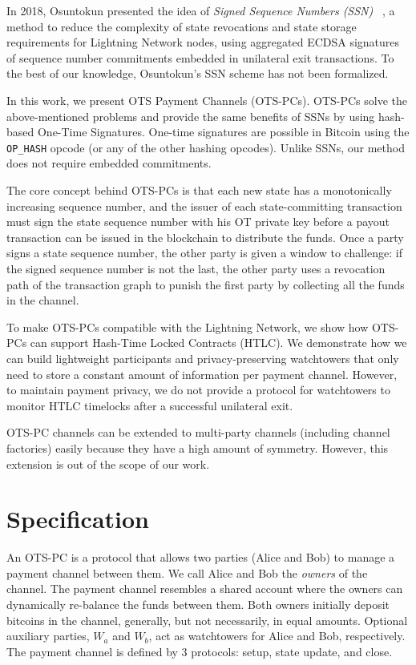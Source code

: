 \documentclass[11pt,a4paper]{article}
\newcommand{\txname}[1]{\texttt{#1}}
\begin{document}
In 2018, Osuntokun presented the idea of \textit{Signed Sequence Numbers (SSN)} ~\cite{osuntokun2018hardeninglightning}, a method to reduce the complexity of state revocations and state storage requirements for Lightning Network nodes, using aggregated ECDSA signatures of sequence number commitments embedded in unilateral exit transactions. To the best of our knowledge, Osuntokun's SSN scheme has not been formalized. 

In this work, we present OTS Payment Channels (OTS-PCs). OTS-PCs solve the above-mentioned problems and provide the same benefits of SSNs by using hash-based One-Time Signatures. One-time signatures are possible in Bitcoin using the \txname{OP\_HASH} opcode (or any of the other hashing opcodes). Unlike SSNs, our method does not require embedded commitments.  

The core concept behind OTS-PCs is that each new state has a monotonically increasing sequence number, and the issuer of each state-committing transaction must sign the state sequence number with his OT private key before a payout transaction can be issued in the blockchain to distribute the funds. Once a party signs a state sequence number, the other party is given a window to challenge: if the signed sequence number is not the last, the other party uses a revocation path of the transaction graph to punish the first party by collecting all the funds in the channel.

To make OTS-PCs compatible with the Lightning Network, we show how OTS-PCs can support Hash-Time Locked Contracts (HTLC). We demonstrate how we can build lightweight participants and privacy-preserving watchtowers that only need to store a constant amount of information per payment channel. However, to maintain payment privacy, we do not provide a protocol for watchtowers to monitor HTLC timelocks after a successful unilateral exit.

OTS-PC channels can be extended to multi-party channels (including channel factories) easily because they have a high amount of symmetry. However, this extension is out of the scope of our work.

\section{Specification}

An OTS-PC is a protocol that allows two parties (Alice and Bob) to manage a payment channel between them. We call Alice and Bob the \textit{owners} of the channel. The payment channel resembles a shared account where the owners can dynamically re-balance the funds between them. Both owners initially deposit bitcoins in the channel, generally, but not necessarily, in equal amounts. Optional auxiliary parties, $W_a$ and $W_b$, act as watchtowers for Alice and Bob, respectively. The payment channel is defined by 3 protocols: setup, state update, and close.
\end{document}
